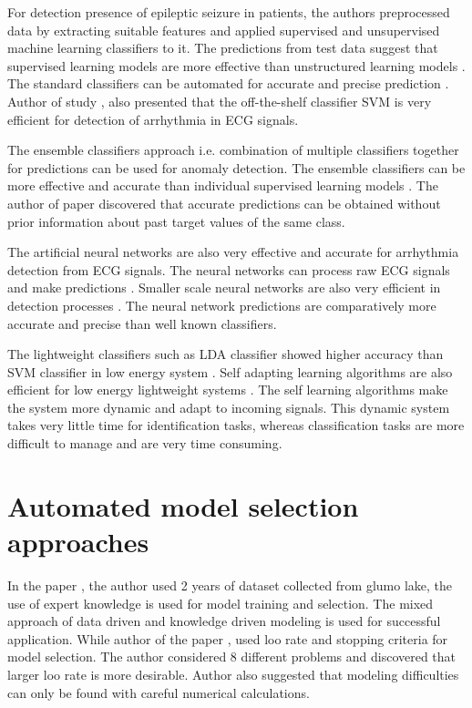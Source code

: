 For detection presence of epileptic seizure in patients, the authors preprocessed data by extracting suitable features and applied supervised and unsupervised machine learning classifiers to it. The predictions from test data suggest that supervised learning models are more effective than unstructured learning models \cite{siddiqui2020review}. The standard classifiers can be automated for accurate and precise prediction \cite{imbrea2021automated}. Author of study \cite{jha2020cardiac}, also presented that the off-the-shelf classifier SVM is very efficient for detection of arrhythmia in ECG signals.

The ensemble classifiers approach i.e. combination of multiple classifiers together for predictions can be used for anomaly detection. The ensemble classifiers can be more effective and accurate than individual supervised learning models \cite{sun2020multi, liu2020parallel, huang2020accurate}. The author of paper \cite{rajak2020applying} discovered that accurate predictions can be obtained without prior information about past target values of the same class.

The artificial neural networks are also very effective and accurate for arrhythmia detection from ECG signals. The neural networks can process raw ECG signals and make predictions \cite{hannun2019cardiologist}. Smaller scale neural networks are also very efficient in detection processes \cite{sannino2018deep}. The neural network predictions are comparatively more accurate and precise than well known classifiers.

The lightweight classifiers such as LDA classifier showed higher accuracy than SVM classifier in low energy system \cite{chen2013design}. Self adapting learning algorithms are also efficient for low energy lightweight systems \cite{lei2007afc, owis2002study}. The self learning algorithms make the system more dynamic and adapt to incoming signals. This dynamic system takes very little time for identification tasks, whereas classification tasks are more difficult to manage and are very time consuming.

\section{Automated model selection approaches} \label{sec:automated_model_selection_approaches}

In the paper \cite{natasa2008}, the author used 2 years of dataset collected from glumo lake, the use of expert knowledge is used for model training and selection. The mixed approach of data driven and knowledge driven modeling is used for successful application. While author of the paper \cite{lee2000automatic}, used loo rate and stopping criteria for model selection. The author considered 8 different problems and discovered that larger loo rate is more desirable. Author also suggested that modeling difficulties can only be found with careful numerical calculations.

